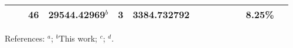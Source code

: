 \begin{table*}
\begin{center}
{\begin{tabular}{:l;l;c;l;c;l;c;l;l;c;c;c;c}
\rowstyle{\itshape}               &        & 46        & 29544.42969$^{b}$                & 3 &   3384.732792      &      & $                                        $ & $                                        $ & $      $ &              & 8.25\%    & $     ^{}     $\\
\hline
\end{tabular}
}
{\footnotesize References:
$^{a}$\citet{Ruffoni:2010:424};
$^{b}$This work;
$^{c}$\citet{Aldenius:2009:014008};
$^{d}$\citet{Nave:2012:1570}.}
\end{center}
\end{table*}

